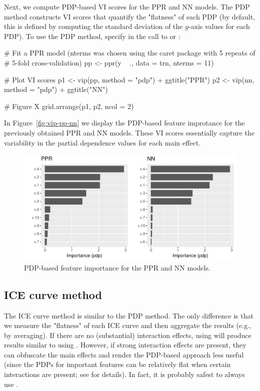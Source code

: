 Next, we compute PDP-based VI scores for the PPR and NN models. The PDP method constructs VI scores that quantify the "flatness" of each PDP (by default, this is defined by computing the standard deviation of the $y$-axis values for each PDP). To use the PDP method, specify  in the call to  or :

\begin{example}
# Fit a PPR model (nterms was chosen using the caret package with 5 repeats of 
# 5-fold cross-validation)
pp <- ppr(y ~ ., data = trn, nterms = 11)  

# Plot VI scores
p1 <- vip(pp, method = "pdp") + ggtitle("PPR")
p2 <- vip(nn, method = "pdp") + ggtitle("NN")

# Figure X
grid.arrange(p1, p2, ncol = 2)
\end{example}

In Figure~\ref{fig:vip-pp-nn} we display the PDP-based feature improtance for the previously obtained PPR and NN models. These VI scores essentially capture the variability in the partial dependence values for each main effect.

\begin{figure}[!htb]
  \centering 
  \includegraphics[width=1\linewidth]{figures/vip-ppr-nn} 
  \caption{PDP-based feature importance for the PPR and NN models.}
  \label{fig:pdp-ppr-nn}
\end{figure}

\subsection{ICE curve method}

The ICE curve method is similar to the PDP method. The only difference is that we measure the "flatness" of each ICE curve and then aggregate the results (e.g., by averaging). If there are no (substantial) interaction effects, using  will produce results similar to using . However, if strong interaction effects are present, they can obfuscate the main effects and render the PDP-based approach less useful (since the PDPs for important features can be relatively flat when certain interactions are present; see \citet{goldstein-peeking-2015} for details). In fact, it is probably safest to always use .

